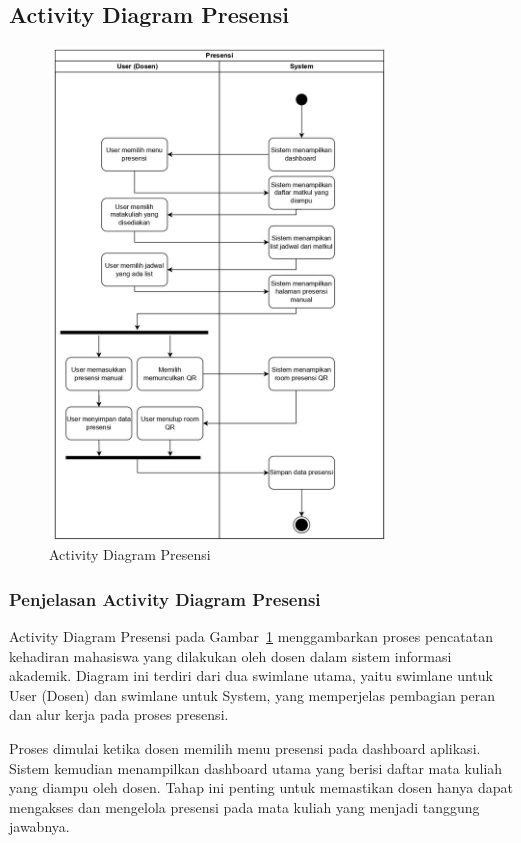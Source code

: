 \documentclass[a4paper,oneside,11pt]{book}
\begin{document}
\subsection{Activity Diagram Presensi}
\begin{figure}[H]
  \centering
  \includegraphics[width=0.8\textwidth]{Activity Diagram/Presensi.jpg}
  \caption{Activity Diagram Presensi}
  \label{fig:activity_presensi}
\end{figure}
\subsubsection{Penjelasan Activity Diagram Presensi}
Activity Diagram Presensi pada Gambar~\ref{fig:activity_presensi} menggambarkan proses pencatatan kehadiran mahasiswa yang dilakukan oleh dosen dalam sistem informasi akademik. Diagram ini terdiri dari dua swimlane utama, yaitu swimlane untuk User (Dosen) dan swimlane untuk System, yang memperjelas pembagian peran dan alur kerja pada proses presensi.

Proses dimulai ketika dosen memilih menu presensi pada dashboard aplikasi. Sistem kemudian menampilkan dashboard utama yang berisi daftar mata kuliah yang diampu oleh dosen. Tahap ini penting untuk memastikan dosen hanya dapat mengakses dan mengelola presensi pada mata kuliah yang menjadi tanggung jawabnya.
\end{document}
